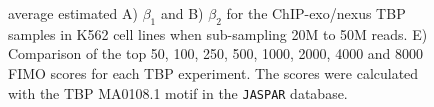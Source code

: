 \documentclass{bmcart}
\begin{document}
\begin{figure}[h!]
{{    average estimated A) $\beta_1$ and B) $\beta_2$ for the
    ChIP-exo/nexus TBP samples in K562 cell lines when sub-sampling
    20M to 50M reads. E) Comparison of the top 50, 100, 250, 500,
    1000, 2000, 4000 and 8000 FIMO scores for each TBP experiment. The
    scores were calculated with the TBP MA0108.1 motif in the
    \texttt{JASPAR} database.}}
  \label{fig:5}
\end{figure}

\newpage

\end{document}
